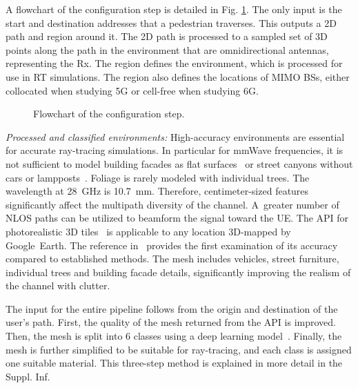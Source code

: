 \documentclass{IEEEtran}
\begin{document}
A flowchart of the configuration step is detailed in Fig. \ref{fig:flowchart_config}. The only input is the start and destination addresses that a pedestrian traverses. This outputs a 2D path and region around it. The 2D path is processed to a sampled set of 3D points along the path in the environment that are omnidirectional antennas, representing the Rx. The region defines the environment, which is processed for use in \gls{RT} simulations. The region also defines the locations of MIMO \glspl{BS}, either collocated when studying \gls{5G} or cell-free when studying \gls{6G}.

\begin{figure}[h]
    \centering
    \def\svgwidth{\columnwidth}
    
    \caption{Flowchart of the configuration step.}
    \label{fig:flowchart_config}
\end{figure}

\textit{Processed and classified environments:} High-accuracy environments are essential for accurate ray-tracing simulations. In particular for \gls{mmWave} frequencies, it is not sufficient to model building facades as flat surfaces~\cite{flatnotenough} or street canyons without cars or lampposts~\cite{lampposts}. Foliage is rarely modeled with individual trees. The wavelength at 28~GHz is 10.7~mm. Therefore, centimeter-sized features significantly affect the multipath diversity of the channel. A~greater number of NLOS paths can be utilized to beamform the signal toward the \gls{UE}. The API for photorealistic 3D tiles~\cite{google} is applicable to any location 3D-mapped by Google~Earth. The reference in~\cite{GoogleEarth} provides the first examination of its accuracy compared to established methods. The mesh includes vehicles, street furniture, individual trees and building facade details, significantly improving the realism of the channel with clutter.

The input for the entire pipeline follows from the origin and destination of the user's path. First, the quality of the mesh returned from the API is improved. Then, the mesh is split into 6 classes using a deep learning model~\cite{SUMS}. Finally, the mesh is further simplified to be suitable for ray-tracing, and each class is assigned one suitable material. This three-step method is explained in more detail in the Suppl. Inf. 
\end{document}
